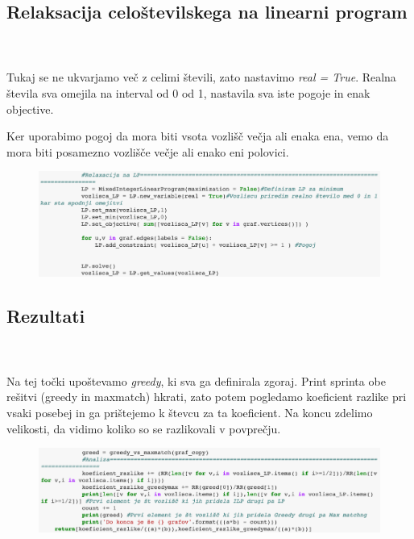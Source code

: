 \documentclass[12pt,a4paper]{amsart}
\theoremstyle{definition} %
\theoremstyle{plain} %
\begin{document}
\newpage

\subsection{Relaksacija celoštevilskega na linearni program}
\
\\
\\
Tukaj se ne ukvarjamo več z celimi števili, zato nastavimo \textit{real = True}. Realna števila sva omejila na interval od 0 od 1, nastavila sva iste pogoje in enak objective.

Ker uporabimo pogoj da mora biti vsota vozlišč večja ali enaka ena, vemo da mora biti posamezno vozlišče večje ali enako eni polovici. 


\begin{figure}[ht]
\centering
\includegraphics[width=1\textwidth]{Screen5.png}
\end{figure}


\newpage

\subsection{Rezultati}
\
\\
\\
Na tej točki upoštevamo \textit{greedy}, ki sva ga definirala zgoraj. Print sprinta obe rešitvi (greedy in maxmatch) hkrati, zato potem pogledamo koeficient razlike pri vsaki posebej in ga prištejemo k števcu za ta koeficient.  Na koncu zdelimo velikosti, da vidimo koliko so se razlikovali v povprečju. 


\begin{figure}[ht]
\centering
\includegraphics[width=1\textwidth]{Screen6.png}
\end{figure}
\end{document}
